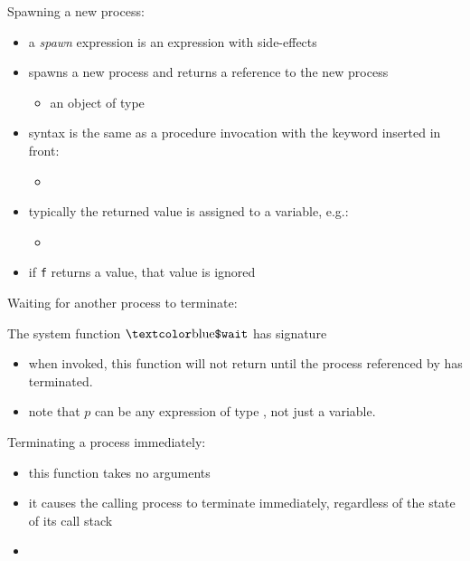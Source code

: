 \documentclass[t]{beamer}
\begin{document}
\begin{frame}{Spawning a new process: \cspawn}
  \begin{itemize}
  \item a \emph{spawn} expression is an expression with side-effects
  \item spawns a new process and returns a reference to the new
    process
    \begin{itemize}
    \item an object of type \cproc
    \end{itemize}
  \item syntax is the same as a procedure invocation with the keyword
    \cspawn{} inserted in front:
    \begin{itemize}
    \item {}
    \end{itemize}
  \item typically the returned value is assigned to a variable, e.g.:
    \begin{itemize}
    \item {}
    \end{itemize}
  \item if \texttt{f} returns a value, that value is ignored
  \end{itemize}
\end{frame}

\begin{frame}{Waiting for another process to terminate: \cwait}

  The system function $\cwait$ has signature

  \begin{center}
  \end{center}

  \begin{itemize}
  \item when invoked, this function will not return until the process
    referenced by  has terminated.
  \item note that $p$ can be any
    expression of type \cproc{}, not just a variable.
  \end{itemize}
\end{frame}

\begin{frame}{Terminating a process immediately: \cexit}
  \begin{itemize}
  \item this function takes no arguments
  \item it causes the calling process to terminate immediately,
    regardless of the state of its call stack
  \item {}
  \end{itemize}
\end{frame}
\end{document}
